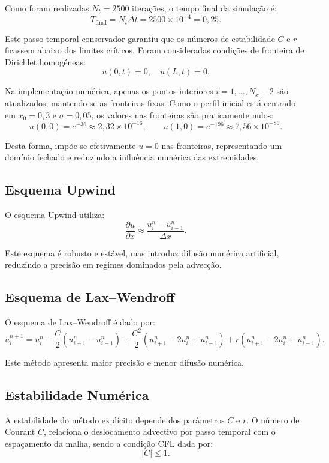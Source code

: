 \documentclass{article}
\begin{document}
Como foram realizadas \(N_t = 2500\) iterações, o tempo final da simulação é:
\[
T_{\text{final}} = N_t \Delta t = 2500 \times 10^{-4} = 0{,}25.
\]

Este passo temporal conservador garantiu que os números de estabilidade \(C\) e \(r\) ficassem abaixo dos limites críticos. Foram consideradas condições de fronteira de Dirichlet homogéneas:
\[
u(0,t) = 0, \quad u(L,t) = 0.
\]

Na implementação numérica, apenas os pontos interiores \(i = 1, \ldots, N_x - 2\) são atualizados, mantendo-se as fronteiras fixas. Como o perfil inicial está centrado em \(x_0 = 0{,}3\) e \(\sigma = 0{,}05\), os valores nas fronteiras são praticamente nulos:
\[
u(0,0) = e^{-36} \approx 2{,}32 \times 10^{-16},
\qquad
u(1,0) = e^{-196} \approx 7{,}56 \times 10^{-86}.
\]

Desta forma, impõe-se efetivamente \(u=0\) nas fronteiras, representando um domínio fechado e reduzindo a influência numérica das extremidades.

\subsection{Esquema Upwind}

O esquema Upwind utiliza:
\[
\frac{\partial u}{\partial x}
\approx
\frac{u_i^n - u_{i-1}^n}{\Delta x}.
\]

Este esquema é robusto e estável, mas introduz difusão numérica artificial, reduzindo a precisão em regimes dominados pela advecção.

\subsection{Esquema de Lax--Wendroff}

O esquema de Lax--Wendroff é dado por:
\[
u_i^{n+1}
=
u_i^n
-
\frac{C}{2} \left(u_{i+1}^n - u_{i-1}^n\right)
+
\frac{C^2}{2} \left(u_{i+1}^n - 2u_i^n + u_{i-1}^n\right)
+
r \left(u_{i+1}^n - 2u_i^n + u_{i-1}^n\right).
\]

Este método apresenta maior precisão e menor difusão numérica.

\subsection{Estabilidade Numérica}

A estabilidade do método explícito depende dos parâmetros \(C\) e \(r\). O número de Courant \(C\), relaciona o deslocamento advectivo por passo temporal com o espaçamento da malha, sendo a condição CFL dada por:
\[
|C| \le 1.
\]
\end{document}
